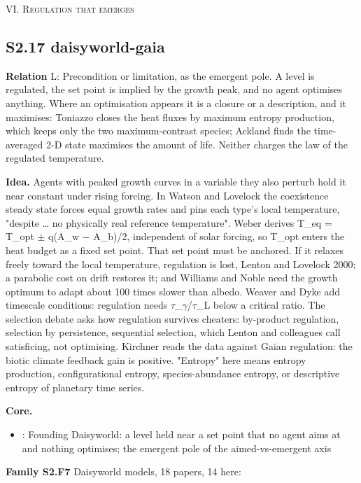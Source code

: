 \documentclass[10pt]{article}
\newcommand{\memb}[1]{\par\smallskip\textbf{#1}\quad}
\begin{document}
\medskip\textsc{VI. Regulation that emerges}

\subsection{S2.17 daisyworld-gaia}\label{node:S2-S2-17-daisyworld-gaia}
\textbf{Relation} \textsf{L}: Precondition or limitation, as the emergent pole. A level is regulated, the set point is implied by the growth peak, and no agent optimises anything. Where an optimisation appears it is a closure or a description, and it maximises: Toniazzo closes the heat fluxes by maximum entropy production, which keeps only the two maximum-contrast species; Ackland finds the time-averaged 2-D state maximises the amount of life. Neither charges the law of the regulated temperature.

\textbf{Idea.} Agents with peaked growth curves in a variable they also perturb hold it near constant under rising forcing. In Watson and Lovelock the coexistence steady state forces equal growth rates and pins each type's local temperature, "despite \dots{} no physically real reference temperature". Weber derives T\_eq = T\_opt \ensuremath{\pm} q(A\_w \ensuremath{-} A\_b)/2, independent of solar forcing, so T\_opt enters the heat budget as a fixed set point. That set point must be anchored. If it relaxes freely toward the local temperature, regulation is lost, Lenton and Lovelock 2000; a parabolic cost on drift restores it; and Williams and Noble need the growth optimum to adapt about 100 times slower than albedo. Weaver and Dyke add timescale conditions: regulation needs \ensuremath{\tau}\_\ensuremath{\gamma}/\ensuremath{\tau}\_L below a critical ratio. The selection debate asks how regulation survives cheaters: by-product regulation, selection by persistence, sequential selection, which Lenton and colleagues call satisficing, not optimising. Kirchner reads the data against Gaian regulation: the biotic climate feedback gain is positive. "Entropy" here means entropy production, configurational entropy, species-abundance entropy, or descriptive entropy of planetary time series.

\memb{Core.}
\begin{itemize}[nosep,leftmargin=1.2em]
\item \citet{Watson-biological83}: Founding Daisyworld: a level held near a set point that no agent aims at and nothing optimises; the emergent pole of the aimed-vs-emergent axis
\end{itemize}
\memb{Family S2.F7} Daisyworld models, 18 papers, 14 here: {\footnotesize \citetext{\citealp{Watson-biological83}; \citealp{LentonLovelock-daisyworld00}; \citealp{Weber-homeostasis01}; \citealp{Wood-daisyworld08}; \citealp{Maull-synthetic24}\dag; \citealp{Sowinski-exodaisy24}; \citealp{LovelockKump-failure94}\dag; \citealp{RobertsonRobinson-darwinian98}; \citealp{LentonLovelock-daisyworld01}\dag; \citealp{Ackland-catastrophic03}; \citealp{Wood-mutation06}; \citealp{NortoftNielsen-homeostasis09}\dag; \citealp{Kageyama-mechanisms20}; \citealp{Arnscheidt-rateinduced24}}}
\end{document}
